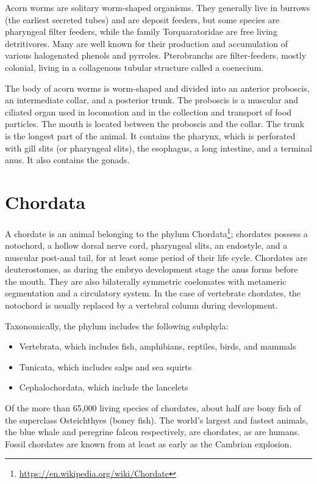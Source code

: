 \documentclass[]{book}
\providecommand{\tightlist}{%
  \setlength{\itemsep}{0pt}\setlength{\parskip}{0pt}}
\let\rmarkdownfootnote\footnote%
\def\footnote{\protect\rmarkdownfootnote}
\renewcommand{\href}[2]{#2\footnote{\url{#1}}}
\begin{document}
Acorn worms are solitary worm-shaped organisms. They generally live in burrows (the earliest secreted tubes) and are deposit feeders, but some species are pharyngeal filter feeders, while the family Torquaratoridae are free living detritivores. Many are well known for their production and accumulation of various halogenated phenols and pyrroles. Pterobranchs are filter-feeders, mostly colonial, living in a collagenous tubular structure called a coenecium.

The body of acorn worms is worm-shaped and divided into an anterior proboscis, an intermediate collar, and a posterior trunk. The proboscis is a muscular and ciliated organ used in locomotion and in the collection and transport of food particles. The mouth is located between the proboscis and the collar. The trunk is the longest part of the animal. It contains the pharynx, which is perforated with gill slits (or pharyngeal slits), the esophagus, a long intestine, and a terminal anus. It also contains the gonads.

\hypertarget{chordata}{%
\section{Chordata}\label{chordata}}

A chordate is an animal belonging to the phylum \href{https://en.wikipedia.org/wiki/Chordate}{Chordata}; chordates possess a notochord, a hollow dorsal nerve cord, pharyngeal slits, an endostyle, and a muscular post-anal tail, for at least some period of their life cycle. Chordates are deuterostomes, as during the embryo development stage the anus forms before the mouth. They are also bilaterally symmetric coelomates with metameric segmentation and a circulatory system. In the case of vertebrate chordates, the notochord is usually replaced by a vertebral column during development.

Taxonomically, the phylum includes the following subphyla:

\begin{itemize}
\tightlist
\item
  Vertebrata, which includes fish, amphibians, reptiles, birds, and mammals
\item
  Tunicata, which includes salps and sea squirts
\item
  Cephalochordata, which include the lancelets
\end{itemize}

Of the more than 65,000 living species of chordates, about half are bony fish of the superclass Osteichthyes (boney fish). The world's largest and fastest animals, the blue whale and peregrine falcon respectively, are chordates, as are humans. Fossil chordates are known from at least as early as the Cambrian explosion.
\end{document}
